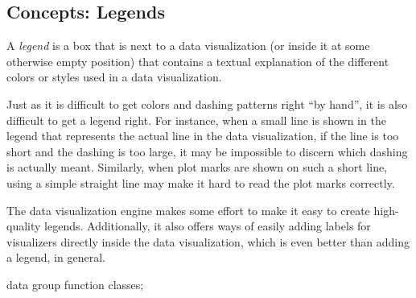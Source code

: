 \subsection{Concepts: Legends}
\label{section-dv-labels-in}

A \emph{legend} is a box that is next to a data visualization (or inside it at
some otherwise empty position) that contains a textual explanation of the
different colors or styles used in a data visualization.

Just as it is difficult to get colors and dashing patterns right ``by hand'',
it is also difficult to get a legend right. For instance, when a small line is
shown in the legend that represents the actual line in the data visualization,
if the line is too short and the dashing is too large, it may be impossible to
discern which dashing is actually meant. Similarly, when plot marks are shown
on such a short line, using a simple straight line may make it hard to read the
plot marks correctly.

The data visualization engine makes some effort to make it easy to create
high-quality legends. Additionally, it also offers ways of easily adding labels
for visualizers directly inside the data visualization, which is even better
than adding a legend, in general.
%
\begin{codeexample}[
    width=7cm,
    preamble={\usetikzlibrary{datavisualization.formats.functions}},
    pre={\tikz \datavisualization data group {function classes} = {
  data [set=log, format=function] {
    var x : interval [0.2:2.5];
    func y = ln(\value x);
  }
  data [set=lin, format=function] {
    var x : interval [-2:2.5];
    func y = 0.5*\value x;
  }
  data [set=squared, format=function] {
    var x : interval [-1.5:1.5];
    func y = \value x*\value x;
  }
  data [set=exp, format=function] {
    var x : interval [-2.5:1];
    func y = exp(\value x);
  }
};}]
\tikz \datavisualization [
  school book axes, all axes={unit length=7.5mm},
  x axis={label=$x$},
  visualize as smooth line/.list={log, lin, squared, exp},
  log=    {label in legend={text=$\log x$}},
  lin=    {label in legend={text=$x/2$}},
  squared={label in legend={text=$x^2$}},
  exp=    {label in legend={text=$e^x$}},
  style sheet=vary dashing]
data group {function classes};
\end{codeexample}

